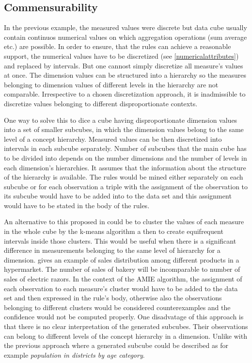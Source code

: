 \subsection{Commensurability\label{commensurability}}

In the previous example, the measured values were discrete but data cube usually contain continuos numerical values on which aggregation operations (sum average etc.) are possible. In order to ensure, that the rules can achieve a reasonable support, the numerical values have to be discretized (see \ref{numericalattributes}) and replaced by intervals. But one cannost simply discretize all measure's values at once. The dimension values can be structured into a hierarchy so the measures belonging to dimension values of different levels in the hierarchy are not comparable.\cite{Chudan2015} Irrespective to a chosen discretization approach, it is inadmissible to discretize values belonging to different disproportionate contexts.

One way to solve this to dice a cube having disproportionate dimension values into a set of smaller subcubes, in which the dimension values belong to the same level of a concept hierarchy. Measured values can be then discretized into intervals in each subcube separately. Number of subcubes that the main cube has to be divided into depends on the number dimensions and the number of levels in each dimension’s hierarchies. It assumes that the information about the structure of the hierarchy is available. The rules would be mined either separately on each subcube or for each observation a triple with the assignment of the observation to its subcube would have to be added into to the data set and this assignment would have to be stated in the body of the rules.

An alternative to this proposed in \cite{Koukal2017} could be to cluster the values of each measure in the whole cube by the k-means algorithm a then to create equifrequent intervals inside those clusters. This would be useful when there is a significant difference in measurements belonging to the same level of hierarchy for a dimension. \cite{Koukal2017} gives an example of sales distribution among different products in a hypermarket. The number of sales of bakery will be incomparable to number of sales of electric razors. In the context of the AMIE algorithm, the assignment of each observation to each measure's cluster would have to be added to the data set and then expressed in the rule's body, otherwise also the observations belonging to different clusters would be considered counterexamples and the confidence would not be computed properly. One disadvatage of this approach is that there is no clear interpretation of the generated subcubes. Their observations can belong to different levels of the concept hierarchy in a dimension. Unlike with the previous approach where a generated subcube could be described as for example \textit{population in districts by age category}.


